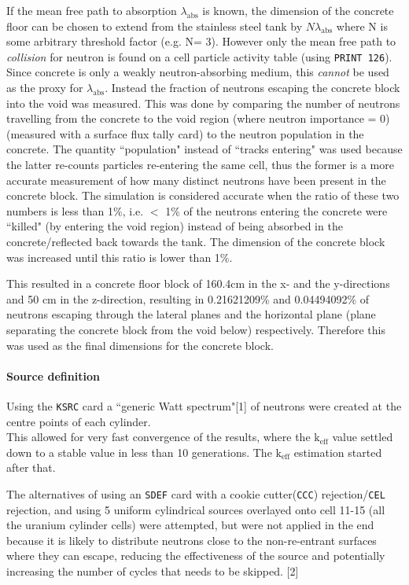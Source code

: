 \documentclass[a4paper, 11pt]{article}
\begin{document}
If the mean free path to absorption $\lambda_{\text{abs}}$ is known, the dimension of the concrete floor can be chosen to extend from the stainless steel tank by $N\lambda_{\text{abs}}$ where N is some arbitrary threshold factor (e.g. N= 3).
However only the mean free path to \emph{collision} for neutron is found on a cell particle activity table (using \texttt{PRINT 126}). Since concrete is only a weakly neutron-absorbing medium, this \emph{cannot} be used as the proxy for $\lambda_{\text{abs}}$. 
Instead the fraction of neutrons escaping the concrete block into the void was measured. This was done by comparing the number of neutrons travelling from the concrete to the void region (where neutron importance = 0) (measured with a surface flux tally card) to the neutron population in the concrete. The quantity ``population" instead of ``tracks entering" was used because the latter re-counts particles re-entering the same cell, thus the former is a more accurate measurement of how many distinct neutrons have been present in the concrete block. The simulation is considered accurate when the ratio of these two numbers is less than 1\%, i.e. $<$ 1\% of the neutrons entering the concrete were ``killed" (by entering the void region) instead of being absorbed in the concrete/reflected back towards the tank. The dimension of the concrete block was increased until this ratio is lower than 1\%.

This resulted in a concrete floor block of 160.4cm in the x- and the y-directions and 50 cm in the z-direction, resulting in 0.21621209\%  and 0.04494092\% of neutrons escaping through the lateral planes and the horizontal plane (plane separating the concrete block from the void below) respectively. Therefore this was used as the final dimensions for the concrete block.

\paragraph{Source definition\indent}
Using the \texttt{KSRC} card a ``generic Watt spectrum"[1] of neutrons were created at the centre points of each cylinder.
\\This allowed for very fast convergence of the results, where the $\text{k}_{\text{eff}}$ value settled down to a stable value in less than 10 generations. The $\text{k}_{\text{eff}}$ estimation started after that.

The alternatives of using an \texttt{SDEF} card with a cookie cutter(\texttt{CCC}) rejection/\texttt{CEL} rejection, and using 5 uniform cylindrical sources overlayed onto cell 11-15 (all the uranium cylinder cells) were attempted, but were not applied in the end because it is likely to distribute neutrons close to the non-re-entrant surfaces where they can escape, reducing the effectiveness of the source and potentially increasing the number of cycles that needs to be skipped. [2]
\end{document}
